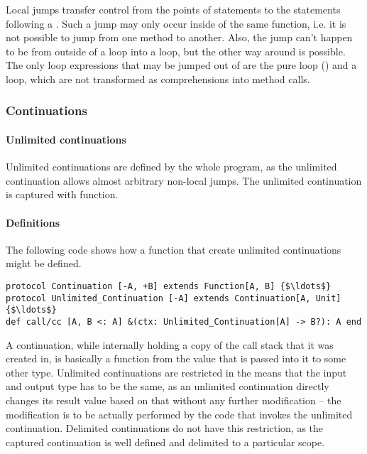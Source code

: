 Local jumps transfer control from the points of  statements to the statements following a . Such a jump may only occur inside of the same function, i.e. it is not possible to jump from one method to another. Also, the jump can't happen to be from outside of a loop into a loop, but the other way around is possible. The only loop expressions that may be jumped out of are the pure loop () and a  loop, which are not transformed as comprehensions into method calls. 






\subsubsection{Continuations}
\label{sec:continuations}






\paragraph{Unlimited continuations}

Unlimited continuations are defined by the whole program, as the unlimited continuation allows almost arbitrary non-local jumps. The unlimited continuation is captured with  function. 

\paragraph{Definitions}
The following code shows how a function that create unlimited continuations might be defined. 
\begin{lstlisting}
protocol Continuation [-A, +B] extends Function[A, B] {$\ldots$}
protocol Unlimited_Continuation [-A] extends Continuation[A, Unit] {$\ldots$}
def call/cc [A, B <: A] &(ctx: Unlimited_Continuation[A] -> B?): A end
\end{lstlisting}

A continuation, while internally holding a copy of the call stack that it was created in, is basically a function from the value that is passed into it to some other type. Unlimited continuations are restricted in the means that the input and output type has to be the same, as an unlimited continuation directly changes its result value based on that without any further modification -- the modification is to be actually performed by the code that invokes the unlimited continuation. Delimited continuations do not have this restriction, as the captured continuation is well defined and delimited to a particular scope. 

